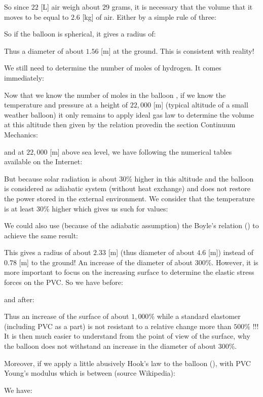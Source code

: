 	So since $22$ [L] air weigh about $29$ grams, it is necessary that the volume that it moves to be equal to $2.6$ [kg] of air. Either by a simple rule of three:
	
	So if the balloon is spherical, it gives a radius of:
	
	Thus a diameter of about $1.56$ [m] at the ground. This is consistent with reality!

	We still need to determine the number of moles of hydrogen. It comes immediately:
	
	Now that we know the number of moles in the balloon , if we know the temperature and pressure at a height of $22,000$ [m] (typical altitude of a small weather balloon) it only remains to apply ideal gas law to determine the volume at this altitude then given by the relation provedin the section Continuum Mechanics:
	
	and at $22,000$ [m] above sea level, we have following the numerical tables available on the Internet:
	
	But because solar radiation is about $30\%$ higher in this altitude and the balloon is considered as adiabatic system (without heat exchange) and does not restore the power stored in the external environment. We consider that the temperature is at least $30\%$ higher which gives us such for values:
	
	
	We could also use (because of the adiabatic assumption) the Boyle's relation () to achieve the same result:
	
	This gives a radius of about $2.33$ [m] (thus diameter  of about $4.6$ [m]) instead of $0.78$ [m] to the ground! An increase of the diameter of about $300\%$. However, it is more important to focus on the increasing surface to determine the elastic stress forces on the PVC. So we have before:
	
	and after:
	
	Thus an increase of the surface of about $1,000\%$ while a standard elastomer (including PVC as a part) is not resistant to a relative change more than $500\%$ !!! It is then much easier to understand from the point of view of the surface, why the balloon does not withstand an increase in the diameter of about $300\%$.

	Moreover, if we apply a little abusively Hook's law to the balloon (), with PVC Young's modulus which is between (source Wikipedia):
	
	We have:
	
